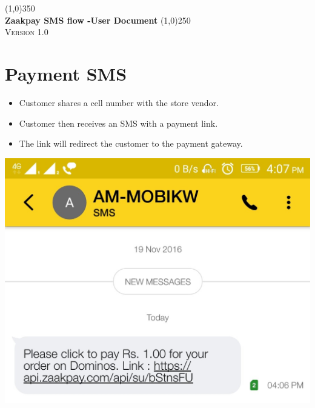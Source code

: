 \documentclass{article}
\begin{document}
\begin{titlepage}
\begin{center}
\line(1,0){350}\\
\huge{\bfseries Zaakpay SMS flow -User Document}
\line(1,0){250}\\
[1.5cm]
\textsc{\Large Version 1.0}
\end{center}


\end{titlepage}
\section{Payment SMS}

\begin{itemize}
\item Customer shares a cell number with the store vendor.
\item Customer then receives an SMS with a payment link.
\item The link will redirect the customer to the payment gateway.
\end{itemize}
\includegraphics[width=4.4 in,height=4.4 in]{Screenshot_2016-11-23-16-07-57-015.jpg}
\newpage
\end{document}
